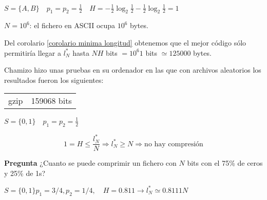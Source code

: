 	\begin{example}


		$S = \{A,B\} \quad p_1 = p_2 = \frac{1}{2} \quad H = -\frac{1}{2} \log_2 \frac{1}{2} - \frac{1}{2} \log_2 \frac{1}{2} = 1$

		$N = 10^6$: el fichero en ASCII ocupa $10^6$ bytes.

		Del corolario \ref{corolario minima longitud} obtenemos que el mejor código sólo permitiría llegar a $l^*_N$ hasta $NH$ bits $= 10^6 1$ bits $\simeq 125000$ bytes.

		Chamizo hizo unas pruebas en su ordenador en las que con archivos aleatorios los resultados fueron los siguientes:

		\begin{table}[h]
			\begin{tabular}{r|c}
			gzip & 159068 bits
			\end{tabular}
		\end{table}


	\end{example}


	\begin{example}

		$S = \{0,1\} \quad p_1 = p_2 = \frac{1}{2}$

		$$ 1 = H \leq \frac{l^*_N}{N} \Rightarrow l^*_N \geq N \Rightarrow \text{no hay compresión} $$

	\end{example}


	\textbf{Pregunta} ¿Cuanto se puede comprimir un fichero con $N$ bits con el 75\% de ceros y 25\% de 1s? 

	$ S= \{0,1\} p_1 = 3/4, p_2 = 1/4, \quad H = 0.811 \rightarrow  l^*_N \simeq 0.8111 N $


